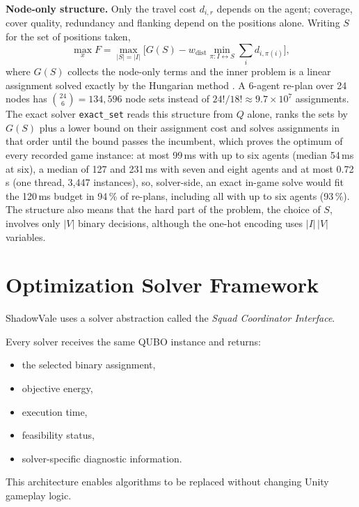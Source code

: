 \documentclass[12pt, a4paper]{article}
\begin{document}
\textbf{Node-only structure.} Only the travel cost $d_{i,r}$ depends on the agent; coverage, cover quality, redundancy and flanking depend on the positions alone. Writing $S$ for the set of positions taken,
$$
\max_x F = \max_{|S|=|I|}\Big[G(S) - w_{\text{dist}}\min_{\pi: I\leftrightarrow S}\sum_i d_{i,\pi(i)}\Big],
$$
where $G(S)$ collects the node-only terms and the inner problem is a linear assignment solved exactly by the Hungarian method \cite{Kuhn1955}. A 6-agent re-plan over 24 nodes has $\binom{24}{6}=134{,}596$ node sets instead of $24!/18! \approx 9.7\times10^7$ assignments. The exact solver \texttt{exact\_set} reads this structure from $Q$ alone, ranks the sets by $G(S)$ plus a lower bound on their assignment cost and solves assignments in that order until the bound passes the incumbent, which proves the optimum of every recorded game instance: at most 99\,ms with up to six agents (median 54\,ms at six), a median of 127 and 231\,ms with seven and eight agents and at most 0.72\,s (one thread, 3{,}447 instances), so, solver-side, an exact in-game solve would fit the 120\,ms budget in 94\,\% of re-plans, including all with up to six agents (93\,\%). The structure also means that the hard part of the problem, the choice of $S$, involves only $|V|$ binary decisions, although the one-hot encoding uses $|I|\,|V|$ variables.

\section*{Optimization Solver Framework}

ShadowVale uses a solver abstraction called the \textit{Squad Coordinator Interface}.

Every solver receives the same QUBO instance and returns:

\begin{itemize}
\item the selected binary assignment,
\item objective energy,
\item execution time,
\item feasibility status,
\item solver-specific diagnostic information.
\end{itemize}

This architecture enables algorithms to be replaced without changing Unity gameplay logic.

\end{document}
